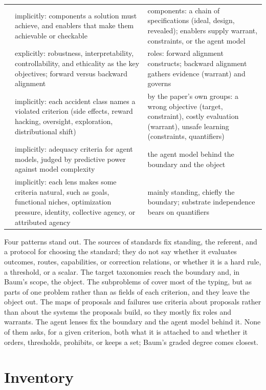\documentclass[11pt]{article}
\begin{document}
{\begin{xltabular}{\textwidth}{@{}L{2.6cm} Y L{4.6cm}@{}}
\textcite{krakovna2022paradigms} & implicitly: components a solution must achieve, and enablers that make them achievable or checkable & components: a chain of specifications (ideal, design, revealed); enablers supply warrant, constraints, or the agent model \\
\textcite{ji2025survey} & explicitly: robustness, interpretability, controllability, and ethicality as the key objectives; forward versus backward alignment & roles: forward alignment constructs; backward alignment gathers evidence (warrant) and governs \\
\textcite{amodei2016concrete} & implicitly: each accident class names a violated criterion (side effects, reward hacking, oversight, exploration, distributional shift) & by the paper's own groups: a wrong objective (target, constraint), costly evaluation (warrant), unsafe learning (constraints, quantifiers) \\
\textcite{hallgren2026taxonomy} & implicitly: adequacy criteria for agent models, judged by predictive power against model complexity & the agent model behind the boundary and the object \\
\textcite{beard2026lenses} & implicitly: each lens makes some criteria natural, such as goals, functional niches, optimization pressure, identity, collective agency, or attributed agency & mainly standing, chiefly the boundary; substrate independence bears on quantifiers \\
\end{xltabular}
}

Four patterns stand out.
The sources of standards fix standing, the referent, and a protocol for choosing the standard; they do not say whether it evaluates outcomes, routes, capabilities, or correction relations, or whether it is a hard rule, a threshold, or a scalar.
The target taxonomies reach the boundary and, in Baum's scope, the object.
The subproblems of \textcite{harris2026taxonomy} cover most of the typing, but as parts of one problem rather than as fields of each criterion, and they leave the object out.
The maps of proposals and failures use criteria about proposals rather than about the systems the proposals build, so they mostly fix roles and warrants.
The agent lenses fix the boundary and the agent model behind it.
None of them asks, for a given criterion, both what it is attached to and whether it orders, thresholds, prohibits, or keeps a set; Baum's graded degree comes closest.

\section{Inventory}
\label{sec:inventory}
\end{document}
